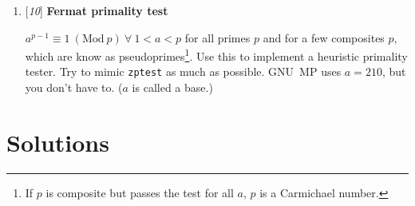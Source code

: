\begin{enumerate}[label=\textbf{\arabic*}.]
\item {[\textit{10}]} \textbf{Fermat primality test}

$a^{p - 1} \equiv 1 ~(\text{Mod}~p) ~\forall~ 1 < a < p$
for all primes $p$ and for a few composites $p$,
which are know as pseudoprimes\footnote{If $p$ is composite
but passes the test for all $a$, $p$ is a Carmichael
number.}. Use this to implement a heuristic primality
tester. Try to mimic \texttt{zptest} as much as possible.
GNU~MP uses $a = 210$, but you don't have to. ($a$ is
called a base.)



\end{enumerate}



\chapter{Solutions}
\label{chap:Solutions}


